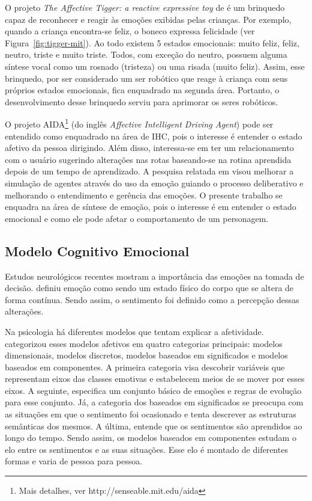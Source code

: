 O projeto \emph{The Affective Tigger: a reactive expressive toy} de
\citet{kirsch1999affective} é um brinquedo capaz de reconhecer e reagir às
emoções exibidas pelas crianças. Por exemplo, quando a criança encontra-se
feliz, o boneco expressa felicidade (ver Figura~\ref{fig:tigger-mit}). Ao todo
existem 5 estados emocionais: muito feliz, feliz, neutro, triste e muito
triste. Todos, com exceção do neutro, possuem alguma síntese vocal como um
rosnado (tristeza) ou uma risada (muito feliz). Assim, esse brinquedo, por ser
considerado um ser robótico que reage à criança com seus próprios estados
emocionais, fica enquadrado na segunda área.  Portanto, o desenvolvimento
desse brinquedo serviu para aprimorar os seres robóticos.

O projeto AIDA\footnote{Mais detalhes, ver http://senseable.mit.edu/aida} (do
inglês \emph{Affective Intelligent Driving Agent}) pode ser entendido como
enquadrado na área de IHC, pois o interesse é entender o estado afetivo da
pessoa dirigindo. Além disso, interessa-se em ter um relacionamento com o
usuário sugerindo alterações nas rotas baseando-se na rotina aprendida depois de
um tempo de aprendizado.  A pesquisa relatada em \citet{dias-agents} visou
melhorar a simulação de agentes através do uso da emoção guiando o processo
deliberativo e melhorando o entendimento e gerência das emoções.  O presente
trabalho se enquadra na área de síntese de emoção, pois o interesse é em
entender o estado emocional e como ele pode afetar o comportamento de um
personagem.

\subsection{Modelo Cognitivo Emocional}

Estudos neurológicos recentes \cite{ledoux1998emotional,damasio2004erro}
mostram a importância das emoções na tomada de decisão.
\citet{damasio2004erro} definiu emoção como sendo um estado físico do corpo
que se altera de forma contínua. Sendo assim, o sentimento foi definido como a
percepção dessas alterações.

Na psicologia há diferentes modelos que tentam explicar a afetividade.
\citet{scherer2000tnoe} categorizou esses modelos afetivos em quatro
categorias principais: modelos dimensionais, modelos discretos, modelos
baseados em significados e modelos baseados em componentes. A primeira
categoria visa descobrir variáveis que representam eixos das classes emotivas
e estabelecem meios de se mover por esses eixos. A seguinte, especifica um
conjunto básico de emoções e regras de evolução para esse conjunto.
Já, a categoria dos baseados em significados se preocupa com as situações
em que o sentimento foi ocasionado e tenta descrever as estruturas semânticas dos
mesmos. A última, entende que os sentimentos são aprendidos ao longo do tempo.
Sendo assim, os modelos baseados em componentes estudam o elo entre os
sentimentos e as suas situações. Esse elo é montado de diferentes formas e
varia de pessoa para pessoa.

